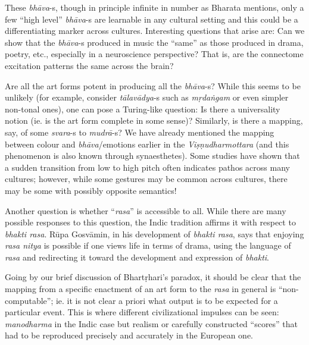 These \textsl{bhāva}-s, though in principle infinite in number as Bharata mentions, only a few “high level” \textsl{bhāva}-s are learnable in any cultural setting and this could be a differentiating marker across cultures. Interesting questions that arise are: Can we show that the \textsl{bhāva}-s produced in music the “same” as those produced in drama, poetry, etc., especially in a neuroscience perspective? That is, are the connectome excitation patterns the same across the brain?

Are all the art forms potent in producing all the \textsl{bhāva}-s? While this seems to be unlikely (for example, consider \textsl{tālavādya}-s such as \textsl{mṛdaṅgam} or even simpler non-tonal ones), one can pose a Turing-like question: Is there a universality notion (ie. is the art form complete in some sense)? Similarly, is there a mapping, say, of some \textsl{svara}-s to \textsl{mudrā}-s? We have already mentioned the mapping between colour and \textsl{bhāva}/emotions earlier in the \textsl{Viṣṇudharmottara} (and this phenomenon is also known through synaesthetes). Some studies have shown that a sudden transition from low to high pitch often indicates pathos across many cultures; however, while some gestures may be common across cultures, there may be some with possibly opposite semantics!

Another question is whether “\textsl{rasa}” is accessible to all. While there are many possible responses to this question, the Indic tradition affirms it with respect to \textsl{bhakti rasa}. Rūpa Gosvāmin, in his development of \textsl{bhakti rasa}, says that enjoying \textsl{rasa nitya} is possible if one views life in terms of drama, using the language of \textsl{rasa} and redirecting it toward the development and expression of \textsl{bhakti}.

Going by our brief discussion of Bhartṛhari’s paradox, it should be clear that the mapping from a specific enactment of an art form to the \textsl{rasa} in general is “non-computable”; ie. it is not clear a priori what output is to be expected for a particular event. This is where different civilizational impulses can be seen: \textsl{manodharma} in the Indic case but realism or carefully constructed “scores” that had to be reproduced precisely and accurately in the European one. 

